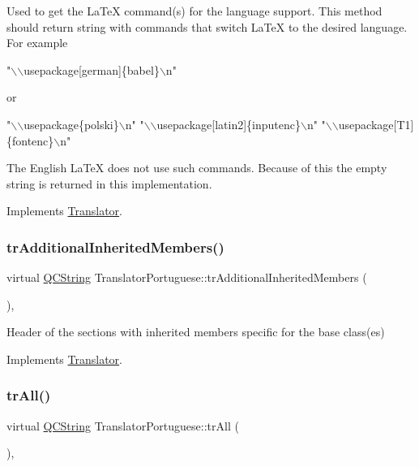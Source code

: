 Used to get the La\+TeX command(s) for the language support. This method should return string with commands that switch La\+TeX to the desired language. For example 
\begin{DoxyPre}"\(\backslash\)\(\backslash\)usepackage[german]\{babel\}\(\backslash\)n"
 \end{DoxyPre}
 or 
\begin{DoxyPre}"\(\backslash\)\(\backslash\)usepackage\{polski\}\(\backslash\)n"
 "\(\backslash\)\(\backslash\)usepackage[latin2]\{inputenc\}\(\backslash\)n"
 "\(\backslash\)\(\backslash\)usepackage[T1]\{fontenc\}\(\backslash\)n"
 \end{DoxyPre}


The English La\+TeX does not use such commands. Because of this the empty string is returned in this implementation. 

Implements \mbox{\hyperlink{class_translator}{Translator}}.

\mbox{\label{class_translator_portuguese_a9a260e90e0db549993e02438563e71f8}} 
\subsubsection{\texorpdfstring{trAdditionalInheritedMembers()}{trAdditionalInheritedMembers()}}
{\footnotesize\ttfamily virtual \mbox{\hyperlink{class_q_c_string}{Q\+C\+String}} Translator\+Portuguese\+::tr\+Additional\+Inherited\+Members (\begin{DoxyParamCaption}{ }\end{DoxyParamCaption})\hspace{0.3cm}{\ttfamily [inline]}, {\ttfamily [virtual]}}

Header of the sections with inherited members specific for the base class(es) 

Implements \mbox{\hyperlink{class_translator}{Translator}}.

\mbox{\label{class_translator_portuguese_aff6802cfce12a2452d0ba2cfa19b2295}} 
\subsubsection{\texorpdfstring{trAll()}{trAll()}}
{\footnotesize\ttfamily virtual \mbox{\hyperlink{class_q_c_string}{Q\+C\+String}} Translator\+Portuguese\+::tr\+All (\begin{DoxyParamCaption}{ }\end{DoxyParamCaption})\hspace{0.3cm}{\ttfamily [inline]}, {\ttfamily [virtual]}}

